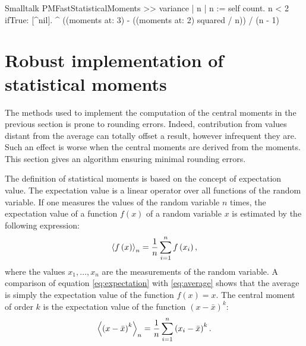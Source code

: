 \begin{displaycode}{Smalltalk}
PMFastStatisticalMoments >> variance
    | n |
    n := self count.
    n < 2 ifTrue: [^nil].
    ^ ((moments at: 3) - ((moments at: 2) squared / n)) / (n - 1)
\end{displaycode}

\section{Robust implementation of statistical moments}
\label{sec:robustmoment} The methods used to implement the
computation of the central moments in the previous section is
prone to rounding errors. Indeed, contribution from values distant
from the average can totally offset a result, however infrequent
they are. Such an effect is worse when the central moments are
derived from the moments. This section gives an algorithm ensuring
minimal rounding errors.

The definition of statistical moments is based on the concept of
expectation value. The expectation value is a linear operator over
all functions of the random variable. If one measures the values
of the random variable $n$ times, the expectation value of a
function $f\left(x\right)$ of a random variable $x$ is estimated
by the following expression:
\begin{equation}
\label{eq:expectation}
 \left\langle f\left(x\right)\right\rangle_n
= {1\over n}\sum_{i=1}^n f\left(x_i\right),
\end{equation}
where the values $x_1,\ldots,x_n$ are the measurements of the
random variable. A comparison of equation \ref{eq:expectation}
with \ref{eq:average} shows that the average is simply the
expectation value of the function $f\left(x\right)=x$. The central
moment of order $k$ is the expectation value of the function
$\left(x-\bar{x}\right)^k$:
\begin{equation}
\label{eq:expectmoment}
 \left\langle \left(x-\bar{x}\right)^k\right\rangle_n
= {1\over n}\sum_{i=1}^n \left(x_i-\bar{x}\right)^k.
\end{equation}

